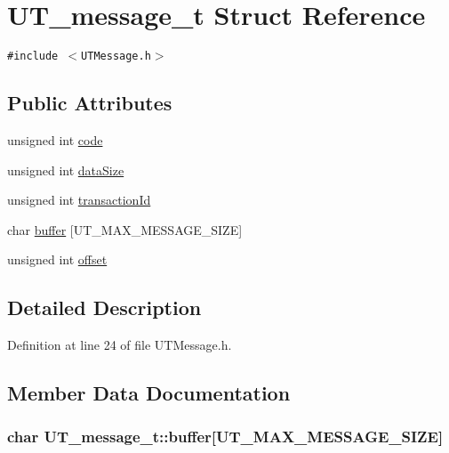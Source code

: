 \hypertarget{struct_u_t__message__t}{
\section{UT\_\-message\_\-t Struct Reference}
\label{struct_u_t__message__t}
}
{\tt \#include $<$UTMessage.h$>$}

\subsection*{Public Attributes}
\begin{CompactItemize}
\item 
unsigned int \hyperlink{struct_u_t__message__t_33ca047b2521e6334191ce0ac75de989}{code}
\item 
unsigned int \hyperlink{struct_u_t__message__t_643aa37f3d335c5da312058e14db18ab}{dataSize}
\item 
unsigned int \hyperlink{struct_u_t__message__t_f8f8e94a39bdefd006d6f806cc8e6737}{transactionId}
\item 
char \hyperlink{struct_u_t__message__t_adbbcf44ac0af349f925415a9088799d}{buffer} \mbox{[}UT\_\-MAX\_\-MESSAGE\_\-SIZE\mbox{]}
\item 
unsigned int \hyperlink{struct_u_t__message__t_e62d8e5f701d54035819d94112ded939}{offset}
\end{CompactItemize}


\subsection{Detailed Description}


Definition at line 24 of file UTMessage.h.

\subsection{Member Data Documentation}
\hypertarget{struct_u_t__message__t_adbbcf44ac0af349f925415a9088799d}{
\subsubsection[{buffer}]{\setlength{\rightskip}{0pt plus 5cm}char {\bf UT\_\-message\_\-t::buffer}\mbox{[}UT\_\-MAX\_\-MESSAGE\_\-SIZE\mbox{]}}}
\label{struct_u_t__message__t_adbbcf44ac0af349f925415a9088799d}




